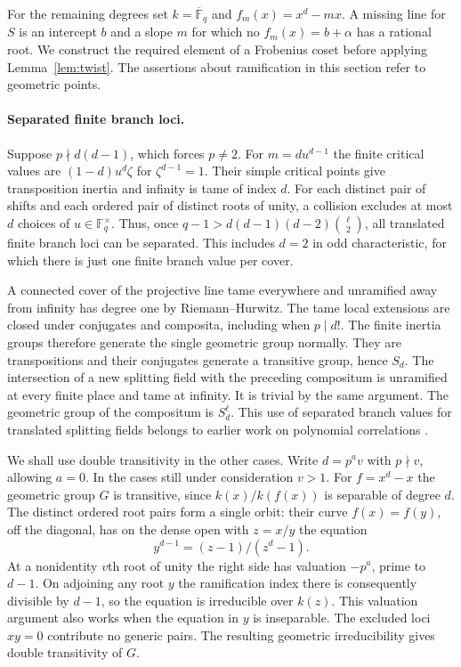 \documentclass[preprint,12pt,numbers]{elsarticle}
\begin{document}
For the remaining degrees set $k=\overline{\mathbb F}_q$ and
$f_m(x)=x^d-mx$. A missing line for $S$ is an intercept $b$ and a slope
$m$ for which no $f_m(x)=b+\alpha$ has a rational root. We construct
the required element of a Frobenius coset before applying
Lemma~\ref{lem:twist}. The assertions about ramification in this
section refer to geometric points.

\paragraph{Separated finite branch loci.}
Suppose $p\nmid d(d-1)$, which forces $p\ne2$. For
$m=d u^{d-1}$ the finite critical values are $(1-d)u^d\zeta$ for
$\zeta^{d-1}=1$. Their simple critical points give transposition inertia
and infinity is tame of index $d$. For each distinct pair of shifts and
each ordered pair of distinct roots of unity, a collision excludes
at most $d$ choices of $u\in\mathbb F_q^\times$. Thus, once
$q-1>d(d-1)(d-2)\binom{\ell}{2}$, all translated finite branch loci
can be separated. This includes $d=2$ in odd characteristic, for which
there is just one finite branch value per cover.

A connected cover of the projective line tame everywhere and unramified
away from infinity has degree one by Riemann--Hurwitz. The tame local
extensions are closed under conjugates and composita, including when
$p\mid d!$. The finite inertia groups therefore generate the single
geometric group normally. They are transpositions and their conjugates
generate a transitive group, hence $S_d$. The intersection of a new
splitting field with the preceding compositum is unramified at every
finite place and tame at infinity. It is trivial by the same argument.
The geometric group of the compositum is $S_d^\ell$. This use of
separated branch values for translated splitting fields belongs to
earlier work on polynomial correlations \cite{Kurlberg,Pollack}.

We shall use double transitivity in the other cases. Write $d=p^a v$
with $p\nmid v$, allowing $a=0$. In the cases still under consideration
$v>1$. For $f=x^d-x$ the geometric group $G$ is transitive, since
$k(x)/k(f(x))$ is separable of degree $d$. The distinct ordered root
pairs form a single orbit: their curve $f(x)=f(y)$, off the diagonal,
has on the dense open with $z=x/y$ the equation
\[
                 y^{d-1}=(z-1)/(z^d-1).
\]
At a nonidentity $v$th root of unity the right side has valuation
$-p^a$, prime to $d-1$. On adjoining any root $y$ the ramification
index there is consequently divisible by $d-1$, so the equation is
irreducible over $k(z)$. This valuation argument also works when the
equation in $y$ is inseparable. The excluded loci $xy=0$ contribute
no generic pairs. The resulting geometric irreducibility gives double
transitivity of $G$.
\end{document}
